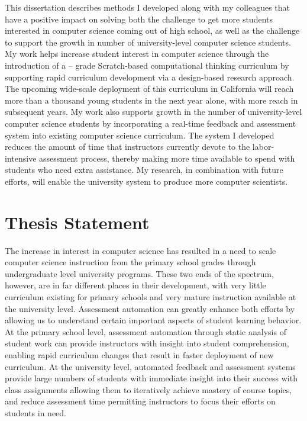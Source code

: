 This dissertation describes methods I developed along with my colleagues that
have a positive impact on solving both the challenge to get more students
interested in computer science coming out of high school, as well as the
challenge to support the growth in number of university-level computer science
students. My work helps increase student interest in computer science through
the introduction of a -- grade Scratch-based computational
thinking curriculum by supporting rapid curriculum development via a
design-based research approach. The upcoming wide-scale deployment of this
curriculum in California will reach more than a thousand young students in the
next year alone, with more reach in subsequent years. My work also supports
growth in the number of university-level computer science students by
incorporating a real-time feedback and assessment system into existing computer
science curriculum. The system I developed reduces the amount of time that
instructors currently devote to the labor-intensive assessment process, thereby
making more time available to spend with students who need extra assistance. My
research, in combination with future efforts, will enable the university system
to produce more computer scientists.

\section{Thesis Statement}
The increase in interest in computer science has resulted in a need to scale
computer science instruction from the primary school grades through
undergraduate level university programs. These two ends of the spectrum,
however, are in far different places in their development, with very little
curriculum existing for primary schools and very mature instruction available
at the university level. Assessment automation can greatly enhance both efforts
by allowing us to understand certain important aspects of student learning
behavior. At the primary school level, assessment automation through static
analysis of student work can provide instructors with insight into student
comprehension, enabling rapid curriculum changes that result in faster
deployment of new curriculum. At the university level, automated feedback and
assessment systems provide large numbers of students with immediate insight
into their success with class assignments allowing them to iteratively achieve
mastery of course topics, and reduce assessment time permitting instructors to
focus their efforts on students in need.

